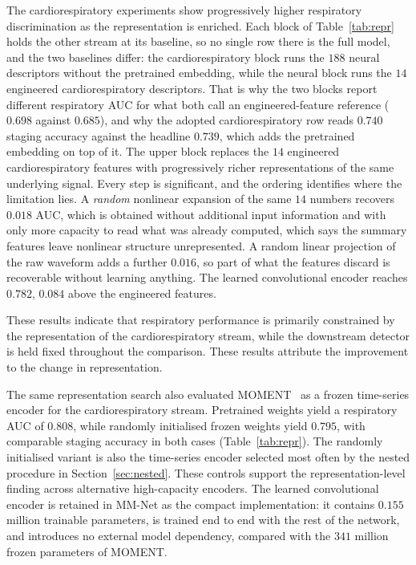 \documentclass{ieeeaccess}
\newcommand{\fzAcc}{0.739}
\begin{document}
The cardiorespiratory experiments show progressively higher respiratory discrimination as the representation is enriched. Each block of Table~\ref{tab:repr} holds the other stream at its baseline, so no single
row there is the full model, and the two baselines differ: the cardiorespiratory block runs
the $188$ neural descriptors without the pretrained embedding, while the neural block runs the
$14$ engineered cardiorespiratory descriptors. That is why the two blocks report different
respiratory AUC for what both call an engineered-feature reference ($0.698$ against $0.685$),
and why the adopted cardiorespiratory row reads $0.740$ staging accuracy against the headline
$\fzAcc$, which adds the pretrained embedding on top of it. The upper block replaces the $14$ engineered cardiorespiratory features
with progressively richer representations of the same underlying signal. Every step is
significant, and the ordering identifies where the limitation lies. A \emph{random} nonlinear expansion of the same
$14$ numbers recovers $0.018$ AUC, which is obtained without additional input information and with only more
capacity to read what was already computed, which says the summary features leave nonlinear
structure unrepresented. A random linear projection of the raw waveform adds a further $0.016$,
so part of what the features discard is recoverable without learning anything. The learned
convolutional encoder reaches $0.782$, $0.084$ above the engineered features.

These results indicate that respiratory performance is primarily constrained by the representation of the cardiorespiratory stream, while the downstream detector is held fixed throughout the comparison. These results attribute the improvement to the change in representation.

The same representation search also evaluated MOMENT~\cite{goswami2024moment} as a frozen
time-series encoder for the cardiorespiratory stream. Pretrained weights yield a respiratory
AUC of $0.808$, while randomly initialised frozen weights yield $0.795$, with comparable
staging accuracy in both cases (Table~\ref{tab:repr}). The randomly initialised variant is also
the time-series encoder selected most often by the nested procedure in
Section~\ref{sec:nested}. These controls support the representation-level finding across
alternative high-capacity encoders. The learned convolutional encoder is retained in MM-Net as
the compact implementation: it contains $0.155$ million trainable parameters, is trained end
to end with the rest of the network, and introduces no external model dependency, compared
with the $341$ million frozen parameters of MOMENT.
\end{document}
